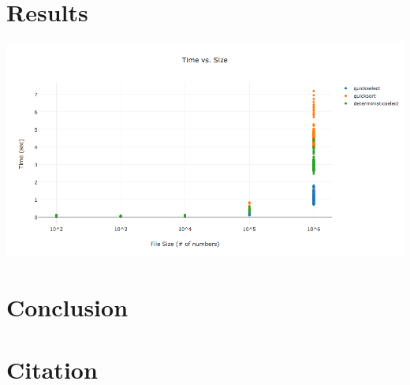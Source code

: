 \documentclass{article}
\begin{document}
\section*{Results}
\includegraphics[scale=.4]{results}

\section*{Conclusion}

\section*{Citation}
\end{document}
